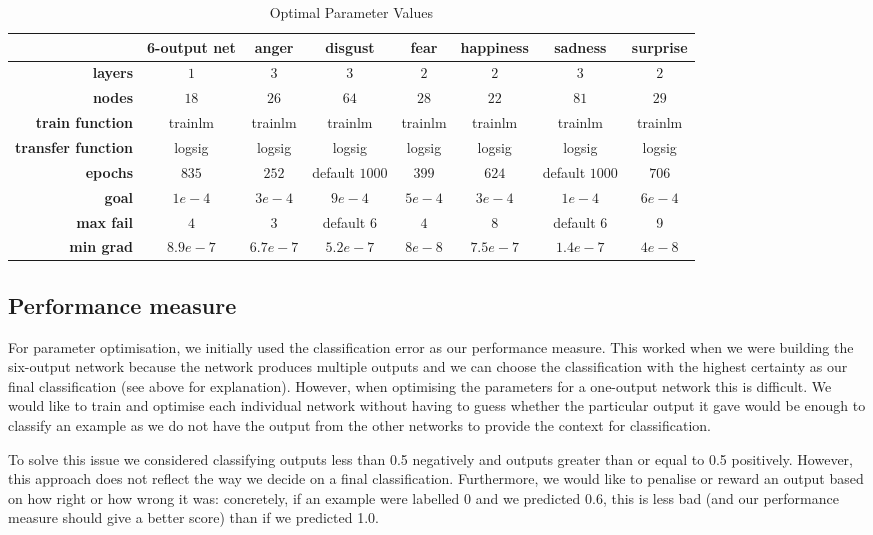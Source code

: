 \documentclass[10pt,a4paper]{article}
\begin{document}
\begin{table}
\centering
\begin{tabular}{|r|c||c|c|c|c|c|c|}
\hline 
 & \textbf{6-output net} & \textbf{anger} & \textbf{disgust} & \textbf{fear} & \textbf{happiness} & \textbf{sadness} & \textbf{surprise} \\ 
\hline 
\textbf{layers} & $1$ & $3$ & $3$ & $2$ & $2$ & $3$ & $2$ \\ 
\hline 
\textbf{nodes} & $18$ & $26$ & $64$ & $28$ & $22$ & $81$ & $29$ \\ 
\hline 
\textbf{train function} & trainlm & trainlm & trainlm & trainlm & trainlm & trainlm & trainlm\\
\hline 
\textbf{transfer function} & logsig & logsig & logsig  & logsig & logsig & logsig & logsig \\
\hline 
\textbf{epochs} & $835$ & $252$ & default $1000$ & $399$ & $624$ & default $1000$ & $706$ \\ 
\hline 
\textbf{goal} & $1e-4$ & $3e-4$ & $9e-4$ & $5e-4$ & $3e-4$ & $1e-4$ & $6e-4$ \\ 
\hline 
\textbf{max fail} & $4$ & $3$ & default $6$ & $4$ & $8$ & default $6$ & 9 \\ 
\hline 
\textbf{min grad} & $8.9e-7$ & $6.7e-7$ & $5.2e-7$ & $8e-8$ & $7.5e-7$ & $1.4e-7$ & $4e-8$ \\ 
\hline 
\end{tabular} 
\caption{Optimal Parameter Values}
\label{tab:optimalValues}
\end{table}

\subsection{Performance measure}
For parameter optimisation, we initially used the classification error as our performance measure. This worked when we were building the six-output network because the network produces multiple outputs and we can choose the classification with the highest certainty as our final classification (see above for explanation). However, when optimising the parameters for a one-output network this is difficult. We would like to train and optimise each individual network without having to guess whether the particular output it gave would be enough to classify an example as we do not have the output from the other networks to provide the context for classification. 

To solve this issue we considered classifying outputs less than 0.5 negatively and outputs greater than or equal to 0.5 positively. However, this approach does not reflect the way we decide on a final classification. Furthermore, we would like to penalise or reward an output based on how right or how wrong it was: concretely, if an example were labelled 0 and we predicted 0.6, this is less bad (and our performance measure should give a better score) than if we predicted 1.0. 
\end{document}
